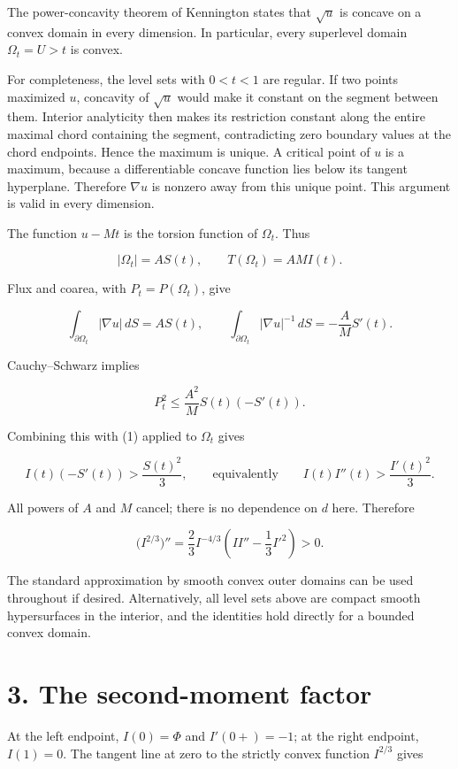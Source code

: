 \documentclass[11pt,a4paper]{article}
\begin{document}
The power-concavity theorem of Kennington states that \(\sqrt{u}\) is
concave on a convex domain in every dimension. In particular, every
superlevel domain \(\Omega _t={U>t}\) is convex.

For completeness, the level sets with \(0<t<1\) are regular. If two
points maximized \(u\), concavity of \(\sqrt{u}\) would make it constant
on the segment between them. Interior analyticity then makes its
restriction constant along the entire maximal chord containing the
segment, contradicting zero boundary values at the chord endpoints.
Hence the maximum is unique. A critical point of \(u\) is a maximum,
because a differentiable concave function lies below its tangent
hyperplane. Therefore \(\nabla u\) is nonzero away from this unique
point. This argument is valid in every dimension.

The function \(u-Mt\) is the torsion function of \(\Omega _t\). Thus

\[
 |\Omega_t|=AS(t),\qquad T(\Omega_t)=AM I(t).
 \tag{3}
\]

Flux and coarea, with \(P_t=P(\Omega _t)\), give

\[
 \int_{\partial\Omega_t}|\nabla u|\,dS=AS(t),\qquad
 \int_{\partial\Omega_t}|\nabla u|^{-1}\,dS
       =-\frac{A}{M}S'(t).
\]

Cauchy--Schwarz implies

\[
 P_t^2\le\frac{A^2}{M}S(t)(-S'(t)).
\]

Combining this with (1) applied to \(\Omega _t\) gives

\[
 I(t)(-S'(t))>\frac{S(t)^2}{3},
 \qquad\text{equivalently}\qquad
 I(t)I''(t)>\frac{I'(t)^2}{3}.
 \tag{4}
\]

All powers of \(A\) and \(M\) cancel; there is no dependence on \(d\)
here. Therefore

\[
 \big(I^{2/3}\big)''
  =\frac23 I^{-4/3}\left(II''-\frac13 I'^2\right)>0.
 \tag{5}
\]

The standard approximation by smooth convex outer domains can be used
throughout if desired. Alternatively, all level sets above are compact
smooth hypersurfaces in the interior, and the identities hold directly
for a bounded convex domain.

\hypertarget{1028-the-second-moment-factor}{%
\section{3. The second-moment factor}\label{1028-the-second-moment-factor}}

At the left endpoint, \(I(0)=\Phi\) and \(I'(0+)=-1\); at the right
endpoint, \(I(1)=0\). The tangent line at zero to the strictly convex
function \(I^{2/3}\) gives
\end{document}
